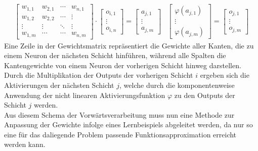 \begin{subequations}
    \begin{align}
        \label{eq:feedforward_matmul}
        \begin{bmatrix}
            w_{1,1} & w_{2,1} & \cdots & w_{n, 1}\\
            w_{1,2} & w_{2,2} & \cdots & \vdots\\
            \vdots & \vdots & \ddots & \vdots\\
            w_{1, m} & \cdots & \cdots & w_{n, m}
        \end{bmatrix}
        \cdot
        \begin{bmatrix}
            o_{i,1}\\
            \vdots\\
            o_{i,n}
        \end{bmatrix}
        =  
        \begin{bmatrix}
            a_{j, 1}\\
            \vdots\\
            a_{j, m}
        \end{bmatrix}
    \end{align}
    \begin{align}
        \label{eq:feedforward_activation}
        \begin{bmatrix}
            \varphi(a_{j, 1})\\
            \vdots\\
            \varphi(a_{j, m})
        \end{bmatrix} 
        =
        \begin{bmatrix}
            o_{j, 1}\\
            \vdots\\
            o_{j, m}
        \end{bmatrix}
    \end{align}
\end{subequations}
Eine Zeile in der Gewichtsmatrix repräsentiert die Gewichte aller Kanten, die zu einem Neuron der nächsten Schicht hinführen, während alle Spalten die Kantengewichte von einem Neuron der vorherigen Schicht hinweg darstellen. Durch die Multiplikation der Outputs der vorherigen Schicht \(i\) ergeben sich die Aktivierungen der nächsten Schicht \(j\), welche durch die komponentenweise Anwendung der nicht linearen Aktivierungsfunktion \(\varphi\) zu den Outputs der Schicht \(j\) werden.\\
Aus diesem Schema der Vorwärtsverarbeitung muss nun eine Methode zur Anpassung der Gewichte infolge eines Lernbeispiels abgeleitet werden, da nur so eine für das daliegende Problem passende Funktionsapproximation erreicht werden kann.
